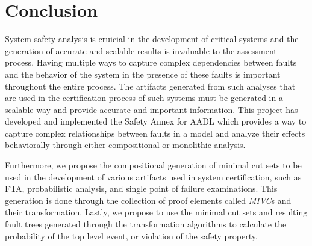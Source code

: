 \chapter{Conclusion}
System safety analysis is cruicial in the development of critical systems and the generation of accurate and scalable results is invaluable to the assessment process. Having multiple ways to capture complex dependencies between faults and the behavior of the system in the presence of these faults is important throughout the entire process. The artifacts generated from such analyses that are used in the certification process of such systems must be generated in a scalable way and provide accurate and important information. This project has developed and implemented the Safety Annex for AADL which provides a way to capture complex relationships between faults in a model and analyze their effects behaviorally through either compositional or monolithic analysis. 

Furthermore, we propose the compositional generation of minimal cut sets to be used in the development of various artifacts used in system certification, such as FTA, probabilistic analysis, and single point of failure examinations. This generation is done through the collection of proof elements called \textit{MIVC}s and their transformation. Lastly, we propose to use the minimal cut sets and resulting fault trees generated through the transformation algorithms to calculate the probability of the top level event, or violation of the safety property.   

